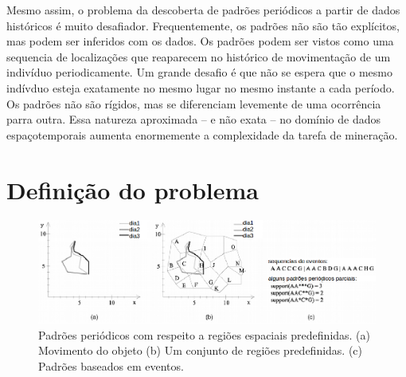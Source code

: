 \documentclass[ppgc,pep]{iiufrgs}
\begin{document}
Mesmo assim, o problema da descoberta de padrões periódicos a partir de
dados históricos é muito desafiador. Frequentemente, os padrões
não são tão explícitos, mas podem ser inferidos com os dados. Os
padrões podem ser vistos como uma sequencia de localizações que 
reaparecem no histórico de movimentação de um indivíduo periodicamente.
Um grande desafio é que não se espera que o mesmo indívduo esteja
exatamente no mesmo lugar no mesmo instante a cada período. Os
padrões não são rígidos, mas se diferenciam levemente de uma
ocorrência parra outra. Essa natureza aproximada -- e não exata --
no domínio de dados espaçotemporais aumenta enormemente a complexidade
da tarefa de mineração.








\section{Definição do problema}


\begin{figure}[h]
	\centering
	\includegraphics[width=1\textwidth]{figurinha2}
	\caption{Padrões periódicos com respeito a regiões espaciais predefinidas. (a) Movimento do objeto (b) Um conjunto
	de regiões predefinidas. (c) Padrões baseados em eventos.}
	\label{crisp-dm}
\end{figure}
\end{document}
